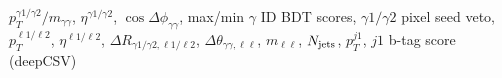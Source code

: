 $p_T^{\gamma 1/\gamma 2}/m_{\gamma\gamma}$, $\eta^{\gamma 1/\gamma 2}$, $\cos{\Delta\phi_{\gamma\gamma}}$, max/min $\gamma$ ID BDT scores, $\gamma 1/\gamma 2$ pixel seed veto, $p_T^{\ell 1/\ell 2}$, $\eta^{\ell 1/\ell 2}$, $\Delta R_{\gamma 1/\gamma 2,\ell 1/\ell 2}$, $\Delta\theta_{\gamma\gamma,\ell\ell}$, $m_{\ell\ell}$, $N_{\rm{jets}}$, $p_T^{j1}$, $j1$ b-tag score (deepCSV)